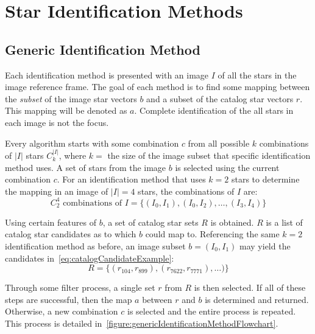 \section{Star Identification Methods}\label{sec:starIdentificationMethods}

\subsection{Generic Identification Method}\label{subsec:genericIdentificationMethod}
Each identification method is presented with an image $I$ of all the stars in the image reference frame.
The goal of each method is to find some mapping between the \textit{subset} of the image star vectors $b$ and a subset
of the catalog star vectors $r$.
This mapping will be denoted as $a$.
Complete identification of the all stars in each image is not the focus.

Every algorithm starts with some combination $c$ from all possible $k$ combinations of $|I|$ stars $C_k^{|I|}$, where
$k = $ the size of the image subset that specific identification method uses.
A set of stars from the image $b$ is selected using the current combination $c$.
For an identification method that uses $k=2$ stars to determine the mapping in an image of $|I|=4$ stars, the
combinations of $I$ are:
\begin{equation}
    C_2^4 \text{ combinations of } I = \{(I_0, I_1), (I_0, I_2), \ldots, (I_3, I_4)\}
\end{equation}

Using certain features of $b$, a set of catalog star sets $R$ is obtained.
$R$ is a list of catalog star candidates as to which $b$ could map to.
Referencing the same $k=2$ identification method as before, an image subset $b = (I_0, I_1)$ may yield the candidates
in~\autoref{eq:catalogCandidateExample}:
\begin{equation}
    \label{eq:catalogCandidateExample}
    R = \{ (r_{104}, r_{899}), (r_{7622}, r_{7771}), \ldots) \}
\end{equation}

Through some filter process, a single set $r$ from $R$ is then selected.
If all of these steps are successful, then the map $a$ between $r$ and $b$ is determined and returned.
Otherwise, a new combination $c$ is selected and the entire process is repeated.
This process is detailed in~\autoref{figure:genericIdentificationMethodFlowchart}.

\begin{figure}
\end{figure}


